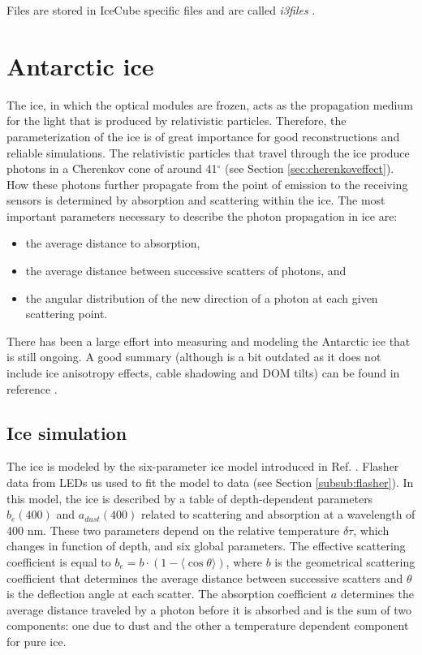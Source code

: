 \noindent Files are stored in IceCube specific files and are called \textit{i3files} .

\section{Antarctic ice}
\label{sec:ice}
The ice, in which the optical modules are frozen, acts as the propagation medium for the light that is produced by relativistic particles. Therefore, the parameterization of the ice is of great importance for good reconstructions and reliable simulations. The relativistic particles that travel through the ice produce photons in a Cherenkov cone of around 41$^\circ$ (see Section \ref{sec:cherenkoveffect}). How these photons further propagate from the point of emission to the receiving sensors is determined by absorption and scattering within the ice. The most important parameters necessary to describe the photon propagation in ice are:
\vspace{2mm}
\begin{itemize}
\item the average distance to absorption,
\item the average distance between successive scatters of photons, and 
\item the angular distribution of the new direction of a photon at each given scattering point.
\end{itemize}
\vspace{2mm}
There has been a large effort into measuring and modeling the Antarctic ice that is still ongoing. A good summary (although is a bit outdated as it does not include ice anisotropy effects, cable shadowing and DOM tilts) can be found in reference \cite{Aartsen:2013rt}.
\subsection{Ice simulation}
\label{subsec:icesimulation}
The ice is modeled by the six-parameter ice model introduced in Ref. \cite{Ackermann:2006pva}. Flasher data from LEDs us used to fit the model to data (see Section  \ref{subsub:flasher}). In this model, the ice is described by a table of depth-dependent parameters $b_e(400)$ and $a_{dust}(400)$ related to scattering and absorption at a wavelength of 400 nm. These two parameters depend on the relative temperature $\delta \tau$, which changes in function of depth, and six global parameters. The effective scattering coefficient is equal to $b_e = b \cdot \left( 1-\langle \cos \theta \rangle \right)$, where $b$ is the geometrical scattering coefficient that determines the average distance between successive scatters and $\theta$ is the deflection angle at each scatter. The absorption coefficient $a$ determines the average distance traveled by a photon before it is absorbed and is the sum of two components: one due to dust and the other a temperature dependent component for pure ice.

